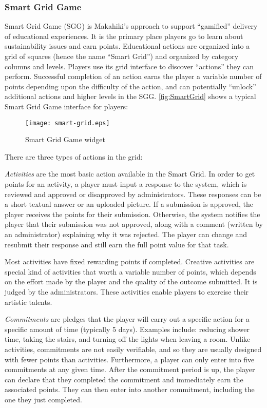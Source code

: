\clearpage

\subsubsection{Smart Grid Game}

Smart Grid Game (SGG) is Makahiki's approach to support ``gamified'' delivery of educational experiences. It is the primary place players go to learn about sustainability issues and earn points. Educational actions are organized into a grid of squares (hence the name ``Smart Grid'') and organized by category columns and levels. Players use its grid interface to discover ``actions'' they can perform. Successful completion of an action earns the player a variable number of points depending upon the difficulty of the action, and can potentially ``unlock'' additional actions and higher levels in the SGG. \autoref{fig:SmartGrid} shows a typical Smart Grid Game interface for players:

\begin{figure}[!ht]
  \center
  \texttt{[image: smart-grid.eps]}
  \caption{Smart Grid Game widget}
  \label{fig:SmartGrid}
\end{figure}

There are three types of actions in the grid:

{\em Activities} are the most basic action available in the Smart Grid. In order to get points for an activity, a player must input a response to the system, which is reviewed and approved or disapproved by administrators. These responses can be a short textual answer or an uploaded picture. If a submission is approved, the player receives the points for their submission. Otherwise, the system notifies the player that their submission was not approved, along with a comment (written by an administrator) explaining why it was rejected. The player can change and resubmit their response and still earn the full point value for that task. 

Most activities have fixed rewarding points if completed. Creative activities are special kind of activities that worth a variable number of points, which depends on the effort made by the player and the quality of the outcome submitted. It is judged by the administrators. These activities enable players to exercise their artistic talents. 

{\em Commitments} are pledges that the player will carry out a specific action for a specific amount of time (typically 5 days). Examples include: reducing shower time, taking the stairs, and turning off the lights when leaving a room. Unlike activities, commitments are not easily verifiable, and so they are usually designed with fewer points than activities. Furthermore, a player can only enter into five commitments at any given time. After the commitment period is up, the player can declare that they completed the commitment and immediately earn the associated points. They can then enter into another commitment, including the one they just completed. 

